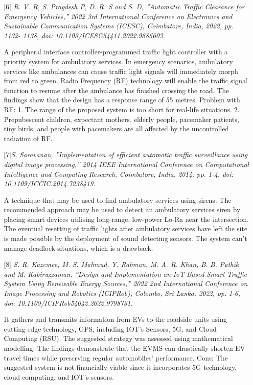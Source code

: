 \documentclass[conference]{IEEEtran}
\begin{document}
[6]\emph{ R. V. R, S. Pragdesh P, D. R. S and S. D, ”Automatic
Traffic Clearance for Emergency Vehicles,” 2022 3rd International Conference on Electronics and Sustainable Communication Systems (ICESC), Coimbatore, India, 2022, pp. 1132-
1138, doi: 10.1109/ICESC54411.2022.9885603. }

A peripheral interface controller-programmed traffic light controller with a priority system for ambulatory services. In emergency scenarios, ambulatory services like ambulances can cause traffic light signals will immediately morph from red to green. Radio Frequency (RF) technology will enable the traffic signal function to resume after the ambulance has finished crossing the road. The findings show that the design has a response range of 55 metres.
Problem with RF:
1. The range of the proposed system is too short for real-life situations.
2. Prepubescent children, expectant mothers, elderly people, pacemaker patients, tiny birds, and people with pacemakers are all affected by the uncontrolled radiation of RF.

[7]\emph{S. Saravanan, ”Implementation of efficient automatic
traffic surveillance using digital image processing,” 2014 IEEE
International Conference on Computational Intelligence and
Computing Research, Coimbatore, India, 2014, pp. 1-4, doi:
10.1109/ICCIC.2014.7238419.}

A technique that may be used to find ambulatory services using sirens. The recommended approach may be used to detect an ambulatory services siren by placing smart devices utilising long-range, low-power Lo-Ra near the intersection. The eventual resetting of traffic lights after ambulatory services have left the site is made possible by the deployment of sound detecting sensors.
The system can't manage deadlock situations, which is a drawback.

[8]\emph{ S. R. Kazemee, M. S. Mahmud, Y. Rahman, M. A. R.
Khan, B. B. Pathik and M. Kabiruzzaman, ”Design and Implementation an IoT Based Smart Traffic System Using Renewable
Energy Sources,” 2022 2nd International Conference on Image
Processing and Robotics (ICIPRob), Colombo, Sri Lanka,
2022, pp. 1-6, doi: 10.1109/ICIPRob54042.2022.9798731.
}

It gathers and transmits information from EVs to the roadside units using cutting-edge technology, GPS, including IOT's Sensors, 5G, and Cloud Computing (RSU). The suggested strategy was assessed using mathematical modelling. The findings demonstrate that the EVMS can drastically shorten EV travel times while preserving regular automobiles' performance.
Cons: The suggested system is not financially viable since it incorporates 5G technology, cloud computing, and IOT's sensors.
\end{document}
